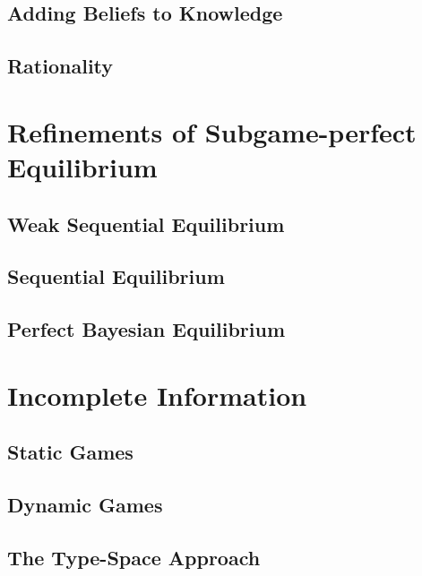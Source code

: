 		\section{Adding Beliefs to Knowledge}

		\section{Rationality}

	\chapter{Refinements of Subgame-perfect Equilibrium}
		\section{Weak Sequential Equilibrium}

		\section{Sequential Equilibrium}

		\section{Perfect Bayesian Equilibrium}

	\chapter{Incomplete Information}
		\section{Static Games}

		\section{Dynamic Games}

		\section{The Type-Space Approach}
